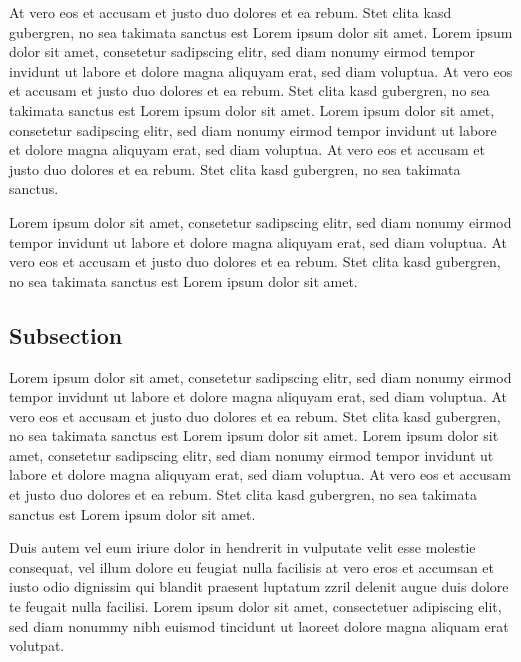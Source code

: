 \documentclass[a4paper]{article}
\begin{document}
    At vero eos et accusam et justo duo dolores et ea rebum. Stet clita kasd gubergren, no sea takimata sanctus est Lorem ipsum dolor sit amet. Lorem ipsum dolor sit amet, consetetur sadipscing elitr, sed diam nonumy eirmod tempor invidunt ut labore et dolore magna aliquyam erat, sed diam voluptua. At vero eos et accusam et justo duo dolores et ea rebum. Stet clita kasd gubergren, no sea takimata sanctus est Lorem ipsum dolor sit amet. Lorem ipsum dolor sit amet, consetetur sadipscing elitr, sed diam nonumy eirmod tempor invidunt ut labore et dolore magna aliquyam erat, sed diam voluptua. At vero eos et accusam et justo duo dolores et ea rebum. Stet clita kasd gubergren, no sea takimata sanctus.   

    Lorem ipsum dolor sit amet, consetetur sadipscing elitr, sed diam nonumy eirmod tempor invidunt ut labore et dolore magna aliquyam erat, sed diam voluptua. At vero eos et accusam et justo duo dolores et ea rebum. Stet clita kasd gubergren, no sea takimata sanctus est Lorem ipsum dolor sit amet. 
    
    \subsection{Subsection}
    
    Lorem ipsum dolor sit amet, consetetur sadipscing elitr, sed diam nonumy eirmod tempor invidunt ut labore et dolore magna aliquyam erat, sed diam voluptua. At vero eos et accusam et justo duo dolores et ea rebum. Stet clita kasd gubergren, no sea takimata sanctus est Lorem ipsum dolor sit amet. Lorem ipsum dolor sit amet, consetetur sadipscing elitr, sed diam nonumy eirmod tempor invidunt ut labore et dolore magna aliquyam erat, sed diam voluptua. At vero eos et accusam et justo duo dolores et ea rebum. Stet clita kasd gubergren, no sea takimata sanctus est Lorem ipsum dolor sit amet.   

    Duis autem vel eum iriure dolor in hendrerit in vulputate velit esse molestie consequat, vel illum dolore eu feugiat nulla facilisis at vero eros et accumsan et iusto odio dignissim qui blandit praesent luptatum zzril delenit augue duis dolore te feugait nulla facilisi. Lorem ipsum dolor sit amet, consectetuer adipiscing elit, sed diam nonummy nibh euismod tincidunt ut laoreet dolore magna aliquam erat volutpat.   
\end{document}
